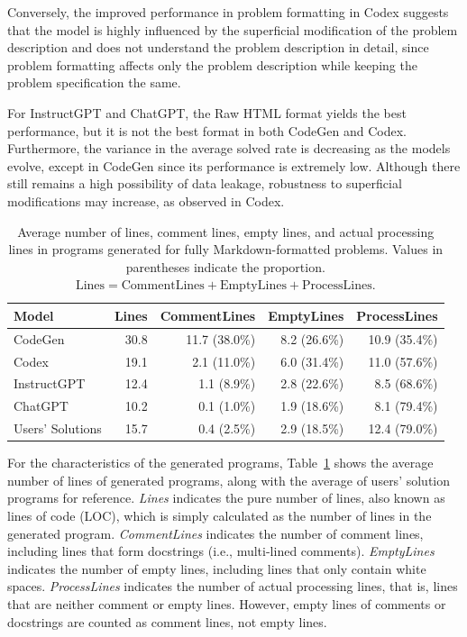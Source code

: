 \documentclass{article}
\begin{document}
Conversely, the improved performance in problem formatting in Codex suggests that the model is highly influenced by the superficial modification of the problem description and does not understand the problem description in detail, since problem formatting affects only the problem description while keeping the problem specification the same.

For InstructGPT and ChatGPT, the Raw HTML format yields the best performance, but it is not the best format in both CodeGen and Codex.
Furthermore, the variance in the average solved rate is decreasing as the models evolve, except in CodeGen since its performance is extremely low.
Although there still remains a high possibility of data leakage, robustness to superficial modifications may increase, as observed in Codex.





\begin{table}[ht]
\begin{center}
\begin{minipage}{0.8\linewidth}
    \caption{Average number of lines, comment lines, empty lines, and actual processing lines in programs generated for fully Markdown-formatted problems. Values in parentheses indicate the proportion. $\text{Lines} = \text{CommentLines} + \text{EmptyLines} + \text{ProcessLines}$.}
    \label{table:lines-result}
    \begin{tabular*}{\linewidth}{lrrrr}
        \toprule
        Model & Lines & CommentLines & EmptyLines & ProcessLines \\
        \midrule
        CodeGen & 30.8 & 11.7 (38.0\%) & 8.2 (26.6\%) & 10.9 (35.4\%) \\
        Codex & 19.1 & 2.1 (11.0\%) & 6.0 (31.4\%) & 11.0 (57.6\%) \\
        InstructGPT & 12.4 & 1.1 (8.9\%) & 2.8 (22.6\%) & 8.5 (68.6\%) \\
        ChatGPT & 10.2 & 0.1 (1.0\%) & 1.9 (18.6\%) & 8.1 (79.4\%) \\
        \midrule
        Users' Solutions & 15.7 & 0.4 (2.5\%) & 2.9 (18.5\%) & 12.4 (79.0\%) \\
        \bottomrule
    \end{tabular*}
\end{minipage}
\end{center}
\end{table}

For the characteristics of the generated programs, Table~\ref{table:lines-result} shows the average number of lines of generated programs, along with the average of users' solution programs for reference.
\textit{Lines} indicates the pure number of lines, also known as lines of code (LOC), which is simply calculated as the number of lines in the generated program.
\textit{CommentLines} indicates the number of comment lines, including lines that form docstrings (i.e., multi-lined comments).
\textit{EmptyLines} indicates the number of empty lines, including lines that only contain white spaces.
\textit{ProcessLines} indicates the number of actual processing lines, that is, lines that are neither comment or empty lines.
However, empty lines of comments or docstrings are counted as comment lines, not empty lines.
\end{document}
